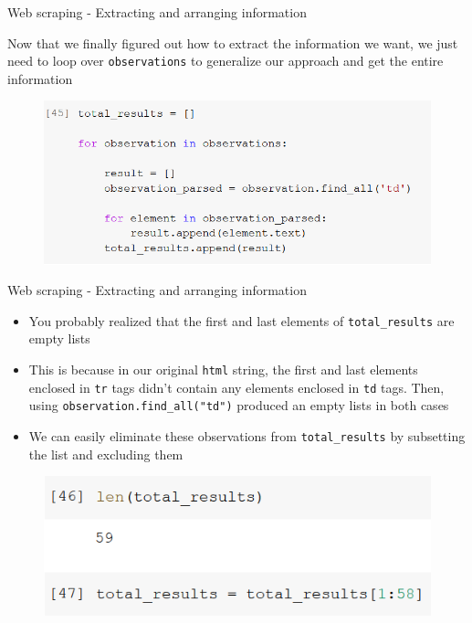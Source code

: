 \documentclass[aspectratio=169]{beamer}
\begin{document}
\begin{frame}{Web scraping - Extracting and arranging information}

	Now that we finally figured out how to extract the information we want, we just need to loop over \texttt{observations} to generalize our approach and get the entire information

	\begin{figure}
		\centering
		\includegraphics[width=0.6\linewidth]{img/tr_loop.png}
	\end{figure}

\end{frame}

\begin{frame}{Web scraping - Extracting and arranging information}

	\begin{itemize}	
		\item You probably realized that the first and last elements of \texttt{total\_results} are empty lists
		\item This is because in our original \texttt{html} string, the first and last elements enclosed in \texttt{tr} tags didn't contain any elements enclosed in \texttt{td} tags. Then, using \texttt{observation.find\_all("td")} produced an empty lists in both cases
		\item We can easily eliminate these observations from \texttt{total\_results} by subsetting the list and excluding them
	\end{itemize}

	\begin{figure}
		\centering
		\includegraphics[width=0.6\linewidth]{img/total_results_subsetting.png}
	\end{figure}

\end{frame}
\end{document}
